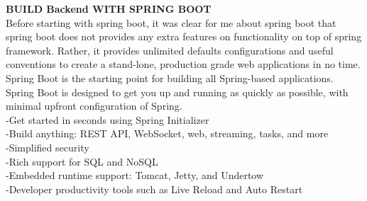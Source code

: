 \documentclass{scrartcl}
\begin{document}
 
\textbf{BUILD Backend WITH SPRING BOOT}\\
Before starting with spring boot, it was clear for me about spring boot that spring boot does not provides any extra features on functionality on top of spring framework. Rather, it provides unlimited defaults configurations and useful conventions to create a stand-lone, production grade web applications in no time.\\
Spring Boot is the starting point for building all Spring-based applications. Spring Boot is designed to get you up and running as quickly as possible, with minimal upfront configuration of Spring.\\
 -Get started in seconds using Spring Initializer\\
-Build anything: REST API, WebSocket, web, streaming, tasks, and more\\
-Simplified security\\
-Rich support for SQL and NoSQL\\
-Embedded runtime support: Tomcat, Jetty, and Undertow\\
-Developer productivity tools such as Live Reload and Auto Restart\\
\end{document}
